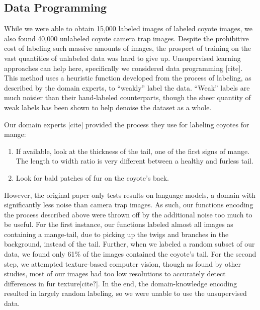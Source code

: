 \documentclass{article}
\begin{document}
\subsection{Data Programming}
While we were able to obtain 15,000 labeled images of labeled coyote images, we also found 40,000 unlabeled coyote camera trap images. Despite the prohibitive cost of labeling such massive amounts of images, the prospect of training on the vast quantities of unlabeled data was hard to give up. Unsupervised learning approaches can help here, specifically we considered data programming [cite]. This method uses a heuristic function developed from the process of labeling, as described by the domain experts, to “weakly” label the data. “Weak” labels are much noisier than their hand-labeled counterparts, though the sheer quantity of weak labels has been shown to help denoise the dataset as a whole.

Our domain experts [cite] provided the process they use for labeling coyotes for mange:
\begin{enumerate}
    \item If available, look at the thickness of the tail, one of the first signs of mange. The length to width ratio is very different between a healthy and furless tail.
    \item Look for bald patches of fur on the coyote’s back.
\end{enumerate}

However, the original paper only tests results on language models, a domain with significantly less noise than camera trap images. As such, our functions encoding the process described above were thrown off by the additional noise too much to be useful. For the first instance, our functions labeled almost all images as containing a mange-tail, due to picking up the twigs and branches in the background, instead of the tail. Further, when we labeled a random subset of our data, we found only 61\% of the images contained the coyote’s tail. For the second step, we attempted texture-based computer vision, though as found by other studies, most of our images had too low resolutions to accurately detect differences in fur texture[cite?]. In the end, the domain-knowledge encoding resulted in largely random labeling, so we were unable to use the unsupervised data.
\end{document}
